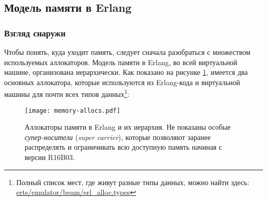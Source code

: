 \documentclass[11pt, oneside]{book}   	%
\newcommand\NamedRef[1]{\ref{#1} <<\nameref{#1}>>}
\begin{document}
\subsection{Модель памяти в Erlang}
\label{subsec:erlang-memory-model}

\subsubsection{Взгляд снаружи}

Чтобы понять, куда уходит память, следует сначала разобраться с множеством используемых аллокаторов. Модель памяти в Erlang, во всей виртуальной машине, организована иерархически. Как показано на рисунке \ref{fig:allocators}, имеется два основных аллокатора, которые используются из Erlang-кода и виртуальной машины для почти всех типов данных\footnote{Полный список мест, где живут разные типы данных, можно найти здесь: \href{https://github.com/erlang/otp/blob/maint/erts/emulator/beam/erl\_alloc.types}{erts/emulator/beam/erl\_alloc.types}}:


\begin{figure}
  \texttt{[image: memory-allocs.pdf]}%
	\caption{Аллокаторы памяти в Erlang и их иерархия. Не показаны особые \emph{супер-носители} (\emph{super carrier}), которые позволяют заранее распределять и ограничивать всю доступную память начиная с версии R16B03.}
   \label{fig:allocators}
\end{figure}
\end{document}
